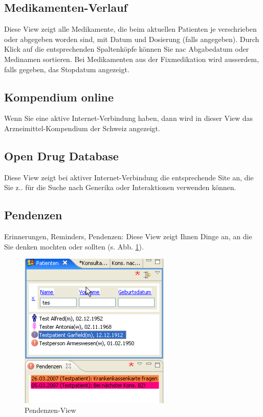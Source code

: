 \subsection{Medikamenten-Verlauf}
Diese View zeigt alle Medikamente, die beim aktuellen Patienten je verschrieben oder abgegeben worden sind, mit Datum und Dosierung (falls angegeben). Durch Klick auf die entsprechenden Spaltenköpfe können Sie nac Abgabedatum oder Medinamen sortieren. Bei Medikamenten aus der Fixmedikation wird ausserdem, falls gegeben, das Stopdatum angezeigt.

\subsection{Kompendium online}
Wenn Sie eine aktive Internet-Verbindung haben, dann wird in dieser View das
Arzneimit\-tel-Kom\-pen\-dium der Schweiz angezeigt.

\subsection{Open Drug Database}
Diese View zeigt bei aktiver Internet-Verbindung die entsprechende Site an, die Sie z.. für die Suche nach Generika oder Interaktionen verwenden können.

\subsection{Pendenzen}
Erinnerungen, Reminders, Pendenzen: Diese View zeigt Ihnen Dinge an, an die Sie
denken mochten oder sollten (s. Abb. \ref{fig:pendenzen}).

\begin{figure}
  \includegraphics[width=7.2cm]{images/pendenzenview}
  \caption{Pendenzen-View}
  \label{fig:pendenzen}
\end{figure}

